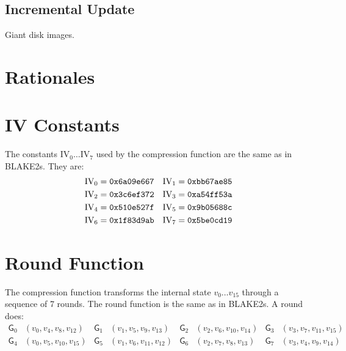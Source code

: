 \documentclass[11pt,notitlepage,a4paper]{article}
\newcommand{\GG}{\mathsf{G}}
\newcommand{\IV}{\text{IV}}
\begin{document}
\subsection{Incremental Update}\label{sec:incrementalupdate}

Giant disk images.

\section{Rationales}\label{sec:rationales}

\nocite{*}



\begin{appendices}

\section{IV Constants}\label{sec:ivconstants}

    The constants $\IV_0 \ldots \IV_7$ used by the compression function are the
    same as in BLAKE2s. They are:
\begin{align*}
    \IV_0 &= \text{\texttt{0x6a09e667}} &
    \IV_1 &= \text{\texttt{0xbb67ae85}} \\
    \IV_2 &= \text{\texttt{0x3c6ef372}} &
    \IV_3 &= \text{\texttt{0xa54ff53a}} \\
    \IV_4 &= \text{\texttt{0x510e527f}} &
    \IV_5 &= \text{\texttt{0x9b05688c}} \\
    \IV_6 &= \text{\texttt{0x1f83d9ab}} &
    \IV_7 &= \text{\texttt{0x5be0cd19}}
\end{align*}

\section{Round Function}\label{sec:roundfn}

    The compression function transforms the internal state $v_{0} \ldots
    v_{15}$ through a sequence of 7 rounds. The round function is the same as
    in BLAKE2s. A round does:
\begin{align*}
    \GG_{0}&(v_{0}, v_{4}, v_{8}, v_{12}) &
    \GG_{1}&(v_{1}, v_{5}, v_{9}, v_{13}) &
    \GG_{2}&(v_{2}, v_{6}, v_{10}, v_{14}) &
    \GG_{3}&(v_{3}, v_{7}, v_{11}, v_{15}) \\
    \GG_{4}&(v_{0}, v_{5}, v_{10}, v_{15}) &
    \GG_{5}&(v_{1}, v_{6}, v_{11}, v_{12}) &
    \GG_{6}&(v_{2}, v_{7}, v_{8}, v_{13}) &
    \GG_{7}&(v_{3}, v_{4}, v_{9}, v_{14})
\end{align*}


\end{appendices}
\end{document}
